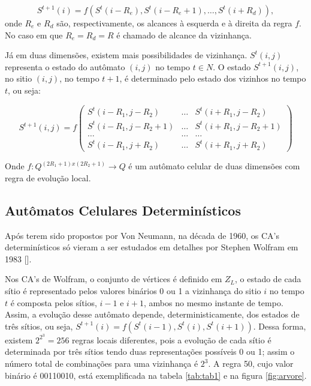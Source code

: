 \documentclass[brazil,ruledheader]{abnt}
\renewcommand{\cite}[1]{[\citeonline{#1}]}
\begin{document}
\begin{equation}
S^{t+1}(i)=f(S^t(i-R_e),S^t(i-R_e+1),\dots,S^t(i+R_d)),
\end{equation}
onde $R_e$ e $R_d$ são, respectivamente, os alcances à esquerda e à direita da
regra $f$. No caso em que $R_e=R_d=R$ é chamado de alcance da vizinhança.

Já em duas dimensões, existem mais possibilidades de vizinhança. $S^t(i,j)$
representa o estado do autômato $(i,j)$ no tempo $t \in N$. O estado
$S^{t+1}(i,j)$, no sitio $(i,j)$, no tempo $t+1$, é determinado pelo estado  dos
vizinhos no tempo $t$, ou seja:

\begin{equation}
 S^{t+1}(i,j)=f\left( \begin{array}{ccc} S^t(i-R_1,j-R_2) & \dots &
S^t(i+R_1,j-R_2) \\ S^t(i-R_1,j-R_2+1) & \dots & S^t(i+R_1,j-R_2+1) \\ \dots &
\dots & \dots \\ S^t(i-R_1,j+R_2) & \dots & S^t(i+R_1,j+R_2) \end{array}\right)
\end{equation}

Onde $f:Q^{(2R_1+1)x(2R_2+1)}\rightarrow Q$ é um autômato celular de duas
dimensões com regra de evolução local.

\subsection{Autômatos Celulares Determinísticos}

Após terem sido propostos por Von Neumann, na década de 1960, os
CA's determinísticos só vieram a ser estudados em detalhes por Stephen Wolfram
em 1983 \cite{Wo83}.

Nos CA’s de Wolfram, o conjunto de vértices é definido em $Z_L$, o estado de
cada
sítio é representado pelos valores binários 0 ou 1  a vizinhança do sitio $i$
no tempo $t$ é composta pelos sítios, $i - 1$ e $i + 1$, ambos no mesmo instante
de tempo.  Assim, a evolução desse autômato depende, deterministicamente, dos
estados de três sítios, ou seja,
$S^{ t+1}(i)=f(S^t(i-1),S^t(i),S^t(i+1))$.\- Dessa forma, existem $2^{2^3}=256$
regras locais diferentes, pois a evolução de cada sítio é determinada por três
sítios tendo duas representações possíveis 0 ou 1; assim o número total de
combinações para uma vizinhança é $2^3$. A regra 50, cujo valor binário é
00110010, está exemplificada na tabela \ref{tab:tab1} e na figura
\ref{fig:arvore}.
\end{document}
